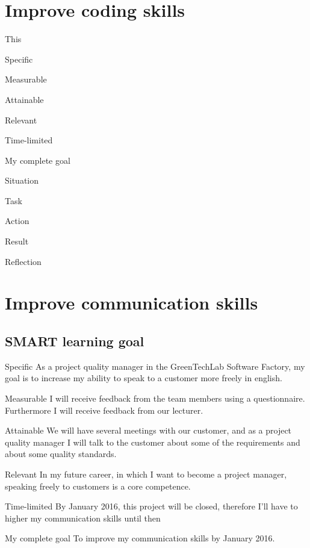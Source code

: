 \documentclass[12pt]{article}
\begin{document}
	\section{Improve coding skills}
	This
	\begin{SMART}
		\item[Specific]
		\item[Measurable]
		\item[Attainable]
		\item[Relevant]
		\item[Time-limited]
		\item[My complete goal]
	\end{SMART}
	
	\begin{STARR}
		\item[Situation]
		\item[Task]
		\item[Action]
		\item[Result]
		\item[Reflection]
	\end{STARR}
	
	\section{Improve communication skills}
	\subsection{SMART learning goal}
	\begin{SMART}
	    \item[Specific] As a project quality manager in the GreenTechLab Software Factory, my goal is to increase my ability to speak to a customer more freely in english.
	    \item[Measurable] I will receive feedback from the team members using a questionnaire. Furthermore I will receive feedback from our lecturer.
	    \item[Attainable] We will have several meetings with our customer, and as a project quality manager I will talk to the customer about some of the requirements and about some quality standards.
	    \item[Relevant] In my future career, in which I want to become a project manager, speaking freely to customers is a core competence.
	    \item[Time-limited] By January 2016, this project will be closed, therefore I’ll have to higher my communication skills until then
	    \item[My complete goal] To improve my communication skills by January 2016.
	\end{SMART}
	
\end{document}
